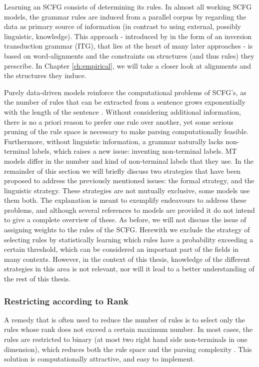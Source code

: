 Learning an SCFG consists of determining its rules. In almost all working SCFG models, the grammar rules are induced from a parallel corpus by regarding the data as primary source of information (in contrast to using external, possibly linguistic, knowledge). This approach - introduced by \cite{wu1995algorithm} in the form of an inversion transduction grammar (ITG), that lies at the heart of many later approaches - is based on word-alignments and the constraints on structures (and thus rules) they prescribe. In Chapter \ref{ch:empirical}, we will take a closer look at alignments and the structures they induce. 

Purely data-driven models reinforce the computational problems of SCFG's, as the number of rules that can be extracted from a sentence grows exponentially with the length of the sentence \citep{quirk2006dependency}. Without considering additional information, there is no a priori reason to prefer one rule over another, yet some serious pruning of the rule space is necessary to make parsing computationally feasible. Furthermore, without linguistic information, a grammar naturally lacks non-terminal labels, which raises a new issue: inventing non-terminal labels. MT models differ in the number and kind of non-terminal labels that they use. In the remainder of this section we will briefly discuss two strategies that have been proposed to address the previously mentioned issues: the formal strategy, and the linguistic strategy. These strategies are not mutually exclusive, some models use them both. The explanation is meant to exemplify endeavours to address these problems, and although several references to models are provided it do not intend to give a complete overview of these. As before, we will not discuss the issue of assigning weights to the rules of the SCFG. Herewith we exclude the strategy of selecting rules by statistically learning which rules have a probability exceeding a certain threshold, which can be considered an important part of the fields in many contexts. However, in the context of this thesis, knowledge of the different strategies in this area is not relevant, nor will it lead to a better understanding of the rest of this thesis.

\subsubsection{Restricting according to Rank}

A remedy that is often used to reduce the number of rules is to select only the rules whose rank does not exceed a certain maximum number. In most cases, the rules are restricted to binary (at most two right hand side non-terminals in one dimension), which reduces both the rule space and the parsing complexity \citep[e.g,][]{wu1997stochastic,chiang2005hierarchical,mylonakis2011learning}. This solution is computationally attractive, and easy to implement. 

